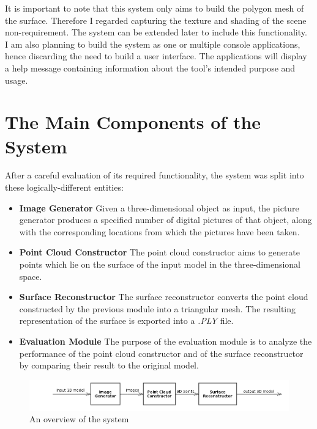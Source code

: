 \documentclass[12pt,a4paper,twoside,openright]{report}
\begin{document}
It is important to note that this system only aims to build the polygon mesh of the surface. Therefore I regarded capturing the texture and shading of the scene non-requirement. The system can be extended later to include this functionality.\\
I am also planning to build the system as one or multiple console applications, hence discarding the need to build a user interface. The applications will display a help message containing information about the tool's intended purpose and usage.

\section{The Main Components of the System}
After a careful evaluation of its required functionality, the system was split into these logically-different entities:
\begin{itemize}
\item \textbf{Image Generator}
Given a three-dimensional object as input, the picture generator produces a specified number of digital pictures of that object, along with the corresponding locations from which the pictures have been taken. 
\item \textbf{Point Cloud Constructor}
The point cloud constructor aims to generate points which lie on the surface of the input model in the three-dimensional space. 
\item \textbf{Surface Reconstructor}
The surface reconstructor converts the point cloud constructed by the previous module into a triangular mesh. The resulting representation of the surface is exported into a \textit{.PLY} file.
\item \textbf{Evaluation Module}
The purpose of the evaluation module is to analyze the performance of the point cloud constructor and of the surface reconstructor by comparing their result to the original model. \\
\end{itemize}
\begin{figure}
\centerline{\includegraphics[scale=0.7]{figs/overview.png}}
\caption{An overview of the system}
\end{figure}
 
\end{document}
